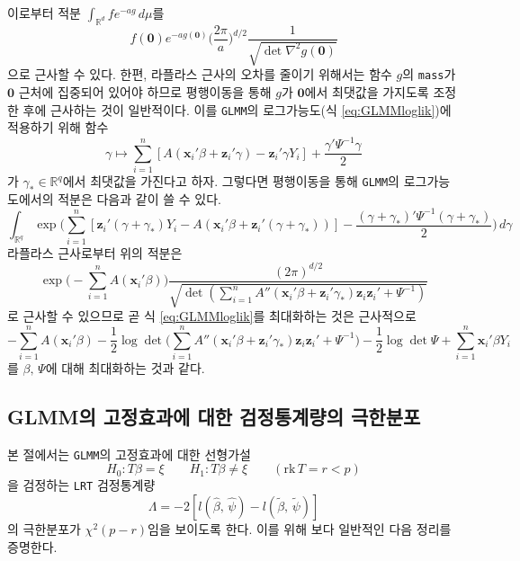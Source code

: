 \documentclass[10pt,onecolumn,twoside,a4size]{gsag3jnl}
\begin{document}
이로부터 적분 $\int_{\mathbb{R}^d}fe^{-ag}\,d\mu$를
\begin{equation}
  f(\mathbf{0})e^{-ag(\mathbf{0})}\bigg(\frac{2\pi}{a}\bigg)^{d/2}\frac{1}{\sqrt{\det\nabla^2g(\mathbf{0})}}
\end{equation}
으로 근사할 수 있다. 한편, 라플라스 근사의 오차를 줄이기 위해서는 함수 $g$의 \texttt{mass}가 $\mathbf{0}$ 근처에 집중되어 있어야 하므로 평행이동을 통해 $g$가 $\mathbf{0}$에서 최댓값을 가지도록 조정한 후에 근사하는 것이 일반적이다. 이를 \texttt{GLMM}의 로그가능도(식 \ref{eq:GLMMloglik})에 적용하기 위해 함수
\begin{equation}
  \gamma\mapsto\sum_{i=1}^n[A(\mathbf{x}_i'\beta+\mathbf{z}_i'\gamma)-\mathbf{z}_i'\gamma Y_i]+\frac{\gamma'\Psi^{-1}\gamma}{2}
\end{equation}
가 $\gamma_*\in\mathbb{R}^q$에서 최댓값을 가진다고 하자. 그렇다면 평행이동을 통해 \texttt{GLMM}의 로그가능도에서의 적분은 다음과 같이 쓸 수 있다.
\begin{equation}
  \int_{\mathbb{R}^q}\exp\bigg(\sum_{i=1}^n[\mathbf{z}_i'(\gamma+\gamma_*)Y_i-A(\mathbf{x}_i'\beta+\mathbf{z}_i'(\gamma+\gamma_*))]-\frac{(\gamma+\gamma_*)'\Psi^{-1}(\gamma+\gamma_*)}{2}\bigg)\,d\gamma
\end{equation}
라플라스 근사로부터 위의 적분은
\begin{equation}
  \exp\bigg(-\sum_{i=1}^nA(\mathbf{x}_i'\beta)\bigg)\frac{(2\pi)^{d/2}}{\sqrt{\det(\sum_{i=1}^nA''(\mathbf{x}_i'\beta+\mathbf{z}_i'\gamma_*)\mathbf{z}_i\mathbf{z}_i'+\Psi^{-1})}}
\end{equation}
로 근사할 수 있으므로 곧 식 \ref{eq:GLMMloglik}를 최대화하는 것은 근사적으로
\begin{equation}
  -\sum_{i=1}^nA(\mathbf{x}_i'\beta)-\frac{1}{2}\log\det\bigg(\sum_{i=1}^nA''(\mathbf{x}_i'\beta+\mathbf{z}_i'\gamma_*)\mathbf{z}_i\mathbf{z}_i'+\Psi^{-1}\bigg)-\frac{1}{2}\log\det\Psi+\sum_{i=1}^n\mathbf{x}_i'\beta Y_i
\end{equation}
를 $\beta,\,\Psi$에 대해 최대화하는 것과 같다.

\subsection{GLMM의 고정효과에 대한 검정통계량의 극한분포}

본 절에서는 \texttt{GLMM}의 고정효과에 대한 선형가설
\begin{equation}\label{eq:linearHypo}
  H_0:T\beta=\xi\qquad H_1:T\beta\ne\xi\qquad(\mathrm{rk}\,T=r<p)
\end{equation}
을 검정하는 \texttt{LRT} 검정통계량
\begin{equation}
  \Lambda=-2[l(\widehat{\beta},\,\widehat{\psi})-l(\widetilde{\beta},\,\widetilde{\psi})]
\end{equation}
의 극한분포가 $\chi^2(p-r)$임을 보이도록 한다. 이를 위해 보다 일반적인 다음 정리를 증명한다.\\
\end{document}
